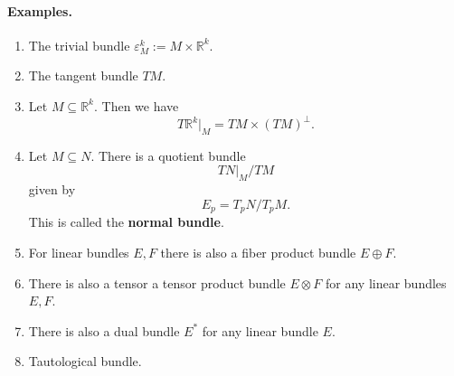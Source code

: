 \paragraph{Examples.}
\begin{enumerate}
    \item The trivial bundle \(\varepsilon^k_M := M \times \mathbb{R}^k \).
    \item The tangent bundle \( TM \).
    \item Let \( M \subseteq \mathbb{R}^k \). Then we have
        \[ 
           T \mathbb{R}^k |_M = TM \times (TM)^\perp. 
       \]
    \item Let \( M \subseteq N \). There is a quotient bundle
        \[ 
           TN|_M / TM 
       \]
       given by
       \[ 
          E_p = T_pN/T_pM. 
      \]
      This is called the \textbf{normal bundle}.
    \item For linear bundles \( E, F \) there is also a fiber product bundle \( E \oplus F \).
    \item There is also a tensor a tensor product bundle \( E \otimes F \) for any linear bundles \( E, F \).
    \item There is also a dual bundle \( E^* \) for any linear bundle \( E \).
    \item Tautological bundle.
\end{enumerate}
